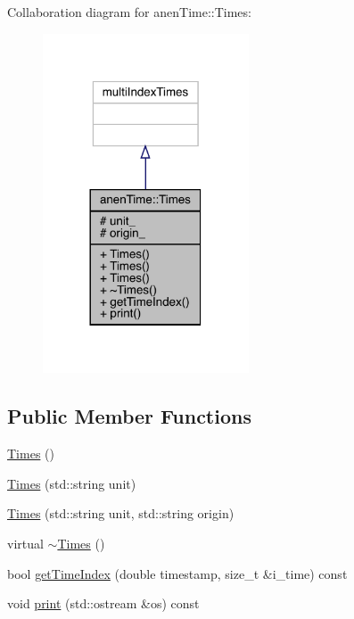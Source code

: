 Collaboration diagram for anen\+Time\+:\+:Times\+:\nopagebreak
\begin{figure}[H]
\begin{center}
\leavevmode
\includegraphics[width=173pt]{classanen_time_1_1_times__coll__graph}
\end{center}
\end{figure}
\subsection*{Public Member Functions}
\begin{DoxyCompactItemize}
\item 
\mbox{\hyperlink{classanen_time_1_1_times_a8ba246100f3c12f80abeb3beb93446f6}{Times}} ()
\item 
\mbox{\hyperlink{classanen_time_1_1_times_a2bd2c89fd910120a72eab80017792125}{Times}} (std\+::string unit)
\item 
\mbox{\hyperlink{classanen_time_1_1_times_a73794184536377320073427409a63da6}{Times}} (std\+::string unit, std\+::string origin)
\item 
virtual \mbox{\hyperlink{classanen_time_1_1_times_a7989831a284e9d10e3ae96ceb2349a3c}{$\sim$\+Times}} ()
\item 
bool \mbox{\hyperlink{classanen_time_1_1_times_a2630149915946c9ca505874b2233123e}{get\+Time\+Index}} (double timestamp, size\+\_\+t \&i\+\_\+time) const
\item 
void \mbox{\hyperlink{classanen_time_1_1_times_acdfa95279c544d2cee2f33415fe4909c}{print}} (std\+::ostream \&os) const
\end{DoxyCompactItemize}
